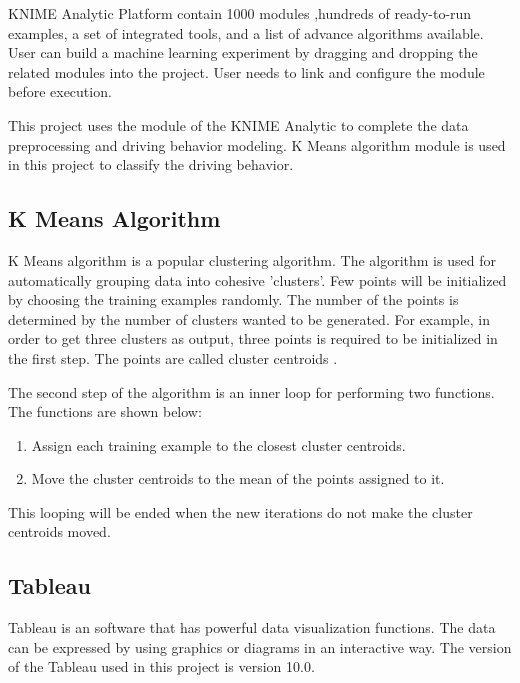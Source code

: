 KNIME Analytic Platform contain 1000 modules ,hundreds of ready-to-run examples, a set of integrated tools, and a list of advance algorithms available. User can build a machine learning experiment by dragging and dropping the related modules into the project. User needs to link and configure the module before execution.

This project uses the module of the KNIME Analytic to complete the data preprocessing and driving behavior modeling. K Means algorithm module is used in this project to classify the driving behavior.

\subsection{K Means Algorithm}
K Means algorithm is a popular clustering algorithm. The algorithm is used for automatically grouping data into cohesive 'clusters'. Few points will be initialized by choosing the training examples randomly. The number of the points is determined by the number of clusters wanted to be generated. For example, in order to get three clusters as output, three points is required to be initialized in the first step. The points are called cluster centroids \cite{andrew:2016}.

The second step of the algorithm is an inner loop for performing two functions. The functions are shown below:
\begin{enumerate}
\item Assign each training example to the closest cluster centroids.
\item Move the cluster centroids to the mean of the points assigned to it.
\end{enumerate} 

This looping will be ended when the new iterations do not make the cluster centroids moved.

\subsection{Tableau}
Tableau is an software that has powerful data visualization functions. The data can be expressed by using graphics or diagrams in an interactive way. The version of the Tableau used in this project is version 10.0.